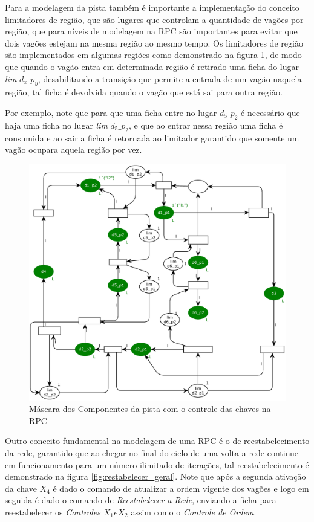 Para a modelagem da pista também é importante a implementação do conceito limitadores de região, que são lugares que controlam a quantidade de vagões por região, que para níveis de modelagem na RPC são importantes para evitar que dois vagões estejam na mesma região ao mesmo tempo. Os limitadores de região são implementados em algumas regiões como demonstrado na figura \ref{fig:limitadores_pista}, de modo que quando o vagão entra em determinada região é retirado uma ficha do lugar \textit{lim} ${d_x\_p_y}$, desabilitando a transição que permite a entrada de um vagão naquela região, tal ficha é devolvida quando o vagão que está sai para outra região. 

Por exemplo, note que para que uma ficha entre no lugar $d_5\_p_2$ é necessário que haja uma ficha no lugar \textit{lim} $d_5\_p_2$, e que ao entrar nessa região uma ficha é consumida e ao sair a ficha é retornada ao limitador garantido que somente um vagão ocupara aquela região por vez.

\begin{figure}[ht]
    \centering
    \caption{Máscara dos Componentes da pista com o controle das chaves na RPC}
    \label{fig:limitadores_pista}
    \includegraphics[width=1\linewidth]{figures//Simulation//Modelagem/limitadores_pista.eps}
\end{figure}

Outro conceito fundamental na modelagem de uma RPC é o de reestabelecimento da rede, garantido que ao chegar no final do ciclo de uma volta a rede continue em funcionamento para um número ilimitado de iterações, tal reestabelecimento é demonstrado na figura \ref{fig:restabelecer_geral}. Note que após a segunda ativação da chave $X_4$ é dado o comando de atualizar a ordem vigente dos vagões e logo em seguida é dado o comando de \textit{Reestabelecer a Rede}, enviando a ficha para reestabelecer os \textit{Controles} $X_1 e X_2$ assim como o \textit{Controle de Ordem}.

